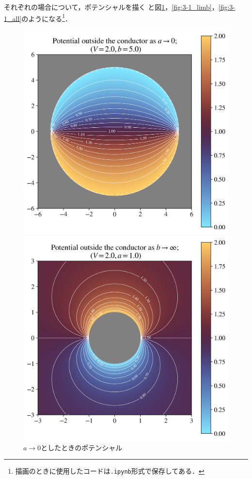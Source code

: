 それぞれの場合について，ポテンシャルを描く
と図\ref{fig:3-1_lima}，\ref{fig:3-1_limb}，\ref{fig:3-1_all}のようになる\footnote{
  描画のときに使用したコードは\texttt{.ipynb}形式で保存してある．
}．
\begin{figure}[H]%
  \centering%
  \begin{minipage}{0.30\linewidth}
    \centering
    \includegraphics[width=\linewidth]{py/3-1_lima.png}%
    \caption{$a \to 0$としたときのポテンシャル}%
    \label{fig:3-1_lima}%
  \end{minipage}
  \begin{minipage}{0.30\linewidth}
    \centering
    \includegraphics[width=\linewidth]{py/3-1_limb.png}%

\end{minipage}
\end{figure}
